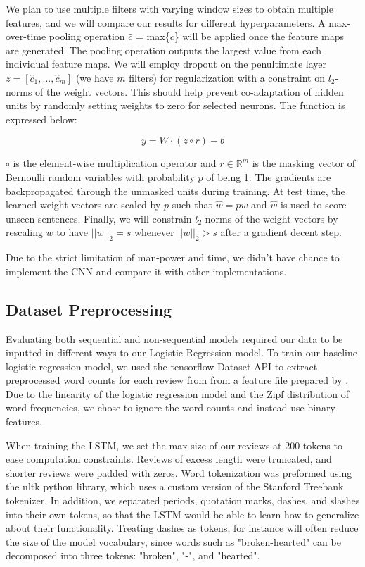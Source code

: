 \documentclass[conference]{IEEEtran}
\begin{document}
    We plan to use multiple filters with varying window sizes to obtain multiple features, and we will
    compare our results for different hyperparameters.
    A max-over-time pooling operation $\hat{c}$ = max\{$c$\} will be applied once the feature
    maps are generated. The pooling operation outputs the largest value from each individual
    feature maps. We will employ dropout on the penultimate layer $z = [\hat{c}_1,...,\hat{c}_m]$
    (we have $m$ filters) for regularization with a constraint on $l_2$-norms of the weight
    vectors. This should help prevent co-adaptation of hidden units by randomly setting weights
    to zero for selected neurons. The function is expressed below:

    \begin{equation}
    y = W \cdot (z \circ r) + b
    \end{equation}

    $\circ$ is the element-wise multiplication operator and $r \in \mathbb{R}^m$ is
    the masking vector of Bernoulli random variables with probability $p$ of being 1.
    The gradients are backpropagated through the unmasked units during training. At test
    time, the learned weight vectors are scaled by $p$ such that $\hat{w} = pw$ and $\hat{w}$
    is used to score unseen sentences. Finally, we will constrain $l_2$-norms of the weight
    vectors by rescaling $w$ to have $||w||_2 = s$ whenever $||w||_2 > s$ after a gradient
    decent step.
    
    Due to the strict limitation of man-power and time, we didn't have chance to 
    implement the CNN and compare it with other implementations.

\subsection{Dataset Preprocessing}
    Evaluating both sequential and non-sequential models required our data to be inputted
    in different ways to our Logistic Regression model. To train our baseline logistic regression
    model, we used the tensorflow Dataset API to extract preprocessed word counts for each
    review from from a feature file prepared by \cite{maas2011learning}. Due to the linearity of
    the logistic regression model and the Zipf distribution of word frequencies, we chose
    to ignore the word counts and instead use binary features.
    
    When training the LSTM, we set the max size of our reviews at 200 tokens to ease
    computation constraints. Reviews of excess length were truncated, and shorter reviews 
    were padded with zeros. Word tokenization was preformed using the nltk python library,
    which uses a custom version of the Stanford Treebank tokenizer. In addition, we separated
    periods, quotation marks, dashes, and slashes into their own tokens, so that the LSTM 
    would be able to learn how to generalize about their functionality. Treating dashes as tokens,
    for instance will often reduce the size of the model vocabulary, since words such as
     "broken-hearted" can be decomposed into three tokens: "broken", "-", and "hearted".
     
\end{document}
